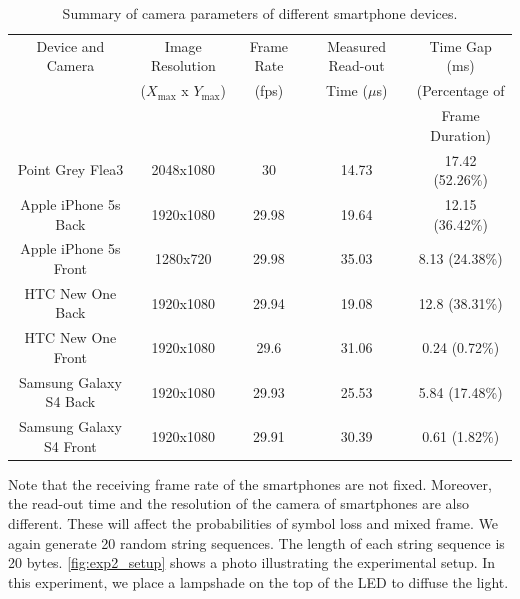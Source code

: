 \begin{table}[!htb]
\centering
\caption{Summary of camera parameters of different smartphone devices.}
   \tabcolsep=0.08cm
    \begin{tabular}{c|c|c|c|c}
    \hline
        Device and Camera & Image Resolution & Frame Rate & Measured Read-out & Time Gap (ms)    \\
                    &   ($X_{\max}$ x $Y_{\max}$)                &  (fps)          &  Time ($\mu$s) &  (Percentage of       \\ 
                    &  &  &  &  Frame Duration)   \\ \hline \hline
    Point Grey Flea3 & 2048x1080          & 30         & 14.73                   & 17.42 (52.26\%) \\ \hline
    Apple iPhone 5s Back  & 1920x1080          & 29.98      & 19.64                   & 12.15 (36.42\%) \\ \hline
    Apple iPhone 5s Front & 1280x720          & 29.98      & 35.03                   & 8.13 (24.38\%) \\ \hline
   HTC New One Back     & 1920x1080          & 29.94        & 19.08                   & 12.8 (38.31\%) \\ \hline
    HTC New One Front  & 1920x1080            & 29.6      & 31.06                   & 0.24 (0.72\%)  \\ \hline
    Samsung Galaxy S4 Back    & 1920x1080             & 29.93      & 25.53                   & 5.84 (17.48\%) \\ \hline
    Samsung Galaxy S4 Front & 1920x1080             & 29.91      & 30.39                   & 0.61 (1.82\%) \\ \hline
    \end{tabular}
    \label{tab:smartphone_spec}
\end{table}

Note that the receiving frame rate of the smartphones are not fixed. Moreover, the read-out time and the resolution of the camera of smartphones are also different. These will affect the probabilities of symbol loss and mixed frame. We again generate 20 random string sequences. The length of each string sequence is 20 bytes. \autoref{fig:exp2_setup} shows a photo illustrating the experimental setup. In this experiment, we place a lampshade on the top of the LED to diffuse the light.

